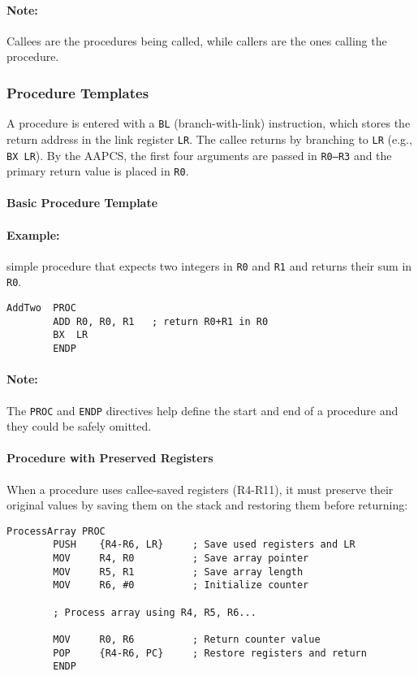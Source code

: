 \paragraph{Note:} Callees are the procedures being called, while callers are the ones calling the procedure.

\subsubsection{Procedure Templates}

A procedure is entered with a \texttt{BL} (branch-with-link) instruction, which stores the return address in the link register \texttt{LR}. The callee returns by branching to \texttt{LR} (e.g., \texttt{BX LR}). By the AAPCS, the first four arguments are passed in \texttt{R0--R3} and the primary return value is placed in \texttt{R0}.
\newpage
\paragraph{Basic Procedure Template}

\paragraph{Example:} simple procedure that expects two integers in \texttt{R0} and \texttt{R1} and returns their sum in \texttt{R0}.

\begin{lstlisting}[caption={Basic procedure structure}]
AddTwo  PROC
        ADD R0, R0, R1   ; return R0+R1 in R0
        BX  LR
        ENDP
\end{lstlisting}
\paragraph{Note:} The \texttt{PROC} and \texttt{ENDP} directives help define the start and end of a procedure and they could be safely omitted.

\paragraph{Procedure with Preserved Registers}

When a procedure uses callee-saved registers (R4-R11), it must preserve their original values by saving them on the stack and restoring them before returning:

\begin{lstlisting}[caption={Procedure using preserved registers}]
ProcessArray PROC
        PUSH    {R4-R6, LR}     ; Save used registers and LR
        MOV     R4, R0          ; Save array pointer
        MOV     R5, R1          ; Save array length  
        MOV     R6, #0          ; Initialize counter
        
        ; Process array using R4, R5, R6...
        
        MOV     R0, R6          ; Return counter value
        POP     {R4-R6, PC}     ; Restore registers and return
        ENDP
\end{lstlisting}

